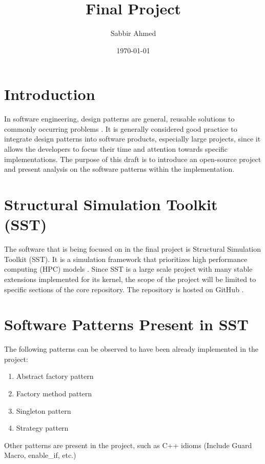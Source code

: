 \documentclass[titlepage]{article}
\title{Final Project}
\author{Sabbir Ahmed}
\date{\today}
\begin{document}
\maketitle

\section{Introduction}
In software engineering, design patterns are general, reusable solutions to commonly occurring problems \cite{source-making}. It is generally considered good practice to integrate design patterns into software products, especially large projects, since it allows the developers to focus their time and attention towards specific implementations. The purpose of this draft is to introduce an open-source project and present analysis on the software patterns within the implementation.

\section{Structural Simulation Toolkit (SST)}
The software that is being focused on in the final project is Structural Simulation Toolkit (SST). It is a simulation framework that prioritizes high performance computing (HPC) models \cite{sst}. Since SST is a large scale project with many stable extensions implemented for its kernel, the scope of the project will be limited to specific sections of the core repository. The repository is hosted on GitHub \cite{sst-repo}.

\section{Software Patterns Present in SST}
The following patterns can be observed to have been already implemented in the project:
\begin{enumerate}
    \item Abstract factory pattern
    \item Factory method pattern
    \item Singleton pattern
    \item Strategy pattern
\end{enumerate}
Other patterns are present in the project, such as C++ idioms (Include Guard Macro, enable\_if, etc.)
\end{document}
